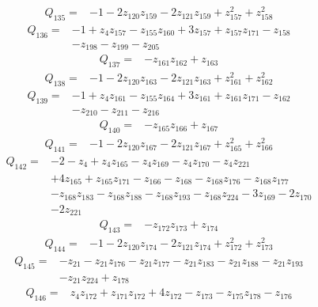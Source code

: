 \[\begin{aligned}Q_{135}={}&-1-2z_{120}z_{159}-2z_{121}z_{159}+z_{157}^{2}+z_{158}^{2}
\end{aligned}\]
\[\begin{aligned}Q_{136}={}&-1+z_{4}z_{157}-z_{155}z_{160}+3z_{157}+z_{157}z_{171}-z_{158}
\\&-z_{198}-z_{199}-z_{205}
\end{aligned}\]
\[\begin{aligned}Q_{137}={}&-z_{161}z_{162}+z_{163}
\end{aligned}\]
\[\begin{aligned}Q_{138}={}&-1-2z_{120}z_{163}-2z_{121}z_{163}+z_{161}^{2}+z_{162}^{2}
\end{aligned}\]
\[\begin{aligned}Q_{139}={}&-1+z_{4}z_{161}-z_{155}z_{164}+3z_{161}+z_{161}z_{171}-z_{162}
\\&-z_{210}-z_{211}-z_{216}
\end{aligned}\]
\[\begin{aligned}Q_{140}={}&-z_{165}z_{166}+z_{167}
\end{aligned}\]
\[\begin{aligned}Q_{141}={}&-1-2z_{120}z_{167}-2z_{121}z_{167}+z_{165}^{2}+z_{166}^{2}
\end{aligned}\]
\[\begin{aligned}Q_{142}={}&-2-z_{4}+z_{4}z_{165}-z_{4}z_{169}-z_{4}z_{170}-z_{4}z_{221}
\\&+4z_{165}+z_{165}z_{171}-z_{166}-z_{168}-z_{168}z_{176}-z_{168}z_{177}
\\&-z_{168}z_{183}-z_{168}z_{188}-z_{168}z_{193}-z_{168}z_{224}-3z_{169}-2z_{170}
\\&-2z_{221}
\end{aligned}\]
\[\begin{aligned}Q_{143}={}&-z_{172}z_{173}+z_{174}
\end{aligned}\]
\[\begin{aligned}Q_{144}={}&-1-2z_{120}z_{174}-2z_{121}z_{174}+z_{172}^{2}+z_{173}^{2}
\end{aligned}\]
\[\begin{aligned}Q_{145}={}&-z_{21}-z_{21}z_{176}-z_{21}z_{177}-z_{21}z_{183}-z_{21}z_{188}-z_{21}z_{193}
\\&-z_{21}z_{224}+z_{178}
\end{aligned}\]
\[\begin{aligned}Q_{146}={}&z_{4}z_{172}+z_{171}z_{172}+4z_{172}-z_{173}-z_{175}z_{178}-z_{176}
\end{aligned}\]
